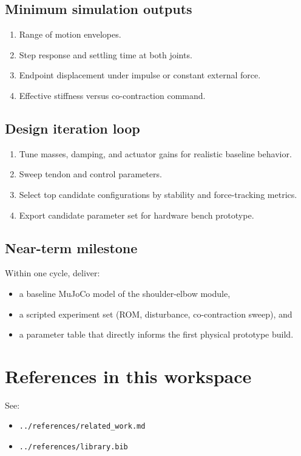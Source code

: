 \documentclass[11pt]{article}
\begin{document}
\subsection*{Minimum simulation outputs}
\begin{enumerate}[leftmargin=*]
  \item Range of motion envelopes.
  \item Step response and settling time at both joints.
  \item Endpoint displacement under impulse or constant external force.
  \item Effective stiffness versus co-contraction command.
\end{enumerate}

\subsection*{Design iteration loop}
\begin{enumerate}[leftmargin=*]
  \item Tune masses, damping, and actuator gains for realistic baseline behavior.
  \item Sweep tendon and control parameters.
  \item Select top candidate configurations by stability and force-tracking metrics.
  \item Export candidate parameter set for hardware bench prototype.
\end{enumerate}

\subsection*{Near-term milestone}
Within one cycle, deliver:
\begin{itemize}[leftmargin=*]
  \item a baseline MuJoCo model of the shoulder-elbow module,
  \item a scripted experiment set (ROM, disturbance, co-contraction sweep), and
  \item a parameter table that directly informs the first physical prototype build.
\end{itemize}

\section*{References in this workspace}
See:
\begin{itemize}[leftmargin=*]
  \item \texttt{../references/related\_work.md}
  \item \texttt{../references/library.bib}
\end{itemize}
\end{document}
